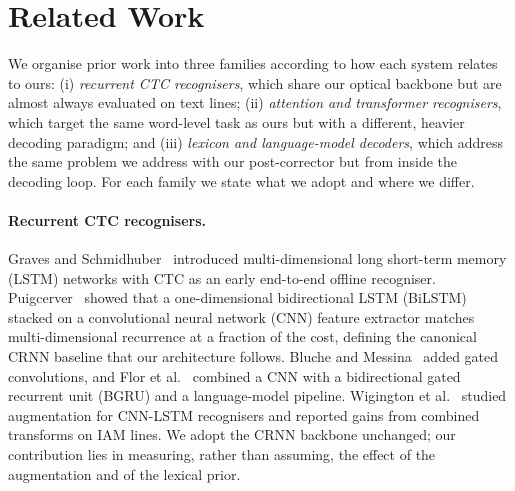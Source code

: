 \documentclass[conference]{IEEEtran}
\begin{document}
\section{Related Work}
\label{sec:related}

We organise prior work into three families according to how each
system relates to ours: (i) \emph{recurrent CTC recognisers}, which
share our optical backbone but are almost always evaluated on text
lines; (ii) \emph{attention and transformer recognisers}, which target
the same word-level task as ours but with a different, heavier
decoding paradigm; and (iii) \emph{lexicon and language-model
decoders}, which address the same problem we address with our
post-corrector but from inside the decoding loop. For each family we
state what we adopt and where we differ.

\paragraph{Recurrent CTC recognisers.}
Graves and Schmidhuber~\cite{graves2008offline} introduced
multi-dimensional long short-term memory (LSTM) networks with CTC as
an early end-to-end offline recogniser. Puigcerver~\cite{puigcerver2017}
showed that a one-dimensional bidirectional LSTM (BiLSTM) stacked on a
convolutional neural network (CNN) feature extractor matches
multi-dimensional recurrence at a fraction of the cost, defining the
canonical CRNN baseline that our architecture follows. Bluche and
Messina~\cite{bluche2017gated} added gated convolutions, and Flor et
al.~\cite{flor2020htrflor} combined a CNN with a bidirectional gated
recurrent unit (BGRU) and a language-model pipeline. Wigington et
al.~\cite{wigington2017data} studied augmentation for CNN-LSTM
recognisers and reported gains from combined transforms on IAM lines.
We adopt the CRNN backbone unchanged; our contribution lies in
measuring, rather than assuming, the effect of the augmentation and of
the lexical prior.
\end{document}
